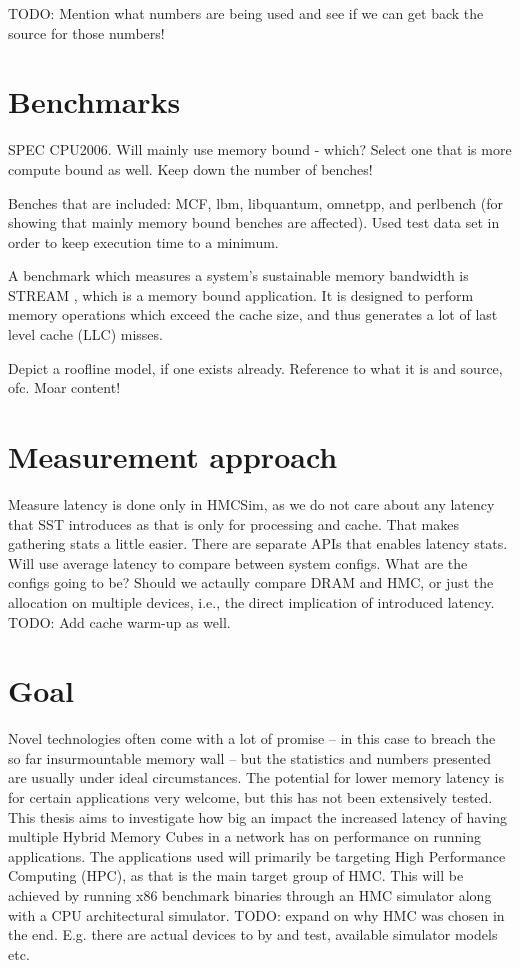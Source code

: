 TODO: Mention what numbers are being used and see if we can get back the source for those numbers!


\section{Benchmarks}
SPEC CPU2006. Will mainly use memory bound - which? Select one that is more compute bound as well. Keep down the number of benches!
\bigskip

Benches that are included:
MCF, lbm, libquantum, omnetpp, and perlbench (for showing that mainly memory bound benches are affected). Used test data set in order to keep execution time to a minimum.

A benchmark which measures a system's sustainable memory bandwidth is STREAM \cite{mccalpin1995memory}, which is a memory bound application. It is designed to perform memory operations which exceed the cache size, and thus generates a lot of last level cache (LLC) misses.

Depict a roofline model, if one exists already. Reference to what it is and source, ofc. Moar content!


\section{Measurement approach}
Measure latency is done only in HMCSim, as we do not care about any latency that SST introduces as that is only for processing and cache. That makes gathering stats a little easier. There are separate APIs that enables latency stats. Will use average latency to compare between system configs. What are the configs going to be? Should we actaully compare DRAM and HMC, or just the allocation on multiple devices, i.e., the direct implication of introduced latency. TODO: Add cache warm-up as well.

\section{Goal}
Novel technologies often come with a lot of promise -- in this case to breach the so far insurmountable memory wall -- but the statistics and numbers presented are usually under ideal circumstances. The potential for lower memory latency is for certain applications very welcome, but this has not been extensively tested. This thesis aims to investigate how big an impact the increased latency of having multiple Hybrid Memory Cubes in a network has on performance on running applications. The applications used will primarily be targeting High Performance Computing (HPC), as that is the main target group of HMC. This will be achieved by running x86 benchmark binaries through an HMC simulator along with a CPU architectural simulator. TODO: expand on why HMC was chosen in the end. E.g. there are actual devices to by and test, available simulator models etc. 

